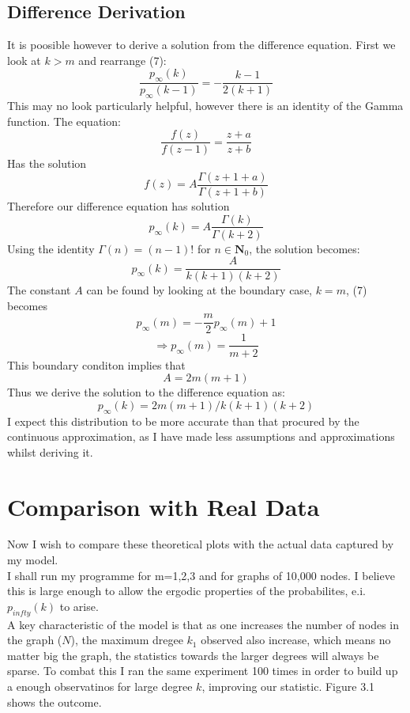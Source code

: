 \documentclass[]{article}
\begin{document}
\subsection{Difference Derivation}
It is poosible however to derive a solution from the difference equation. First we look at $k>m$ and rearrange (7):
\begin{equation}
\frac{p_{\infty}(k)}{p_{\infty}(k-1)}=-\frac{k-1}{2(k+1)}
\end{equation}
This may no look particularly helpful, however there is an identity of the Gamma function. The equation:
\begin{equation}
\frac{f(z)}{f(z-1)}=\frac{z+a}{z+b}
\end{equation}
Has the solution
\begin{equation}
f(z)=A\frac{\Gamma(z+1+a)}{\Gamma(z+1+b)}
\end{equation}
Therefore our difference equation has solution
\begin{equation}
p_{\infty}(k)=A\frac{\Gamma(k)}{\Gamma(k+2)}
\end{equation}
Using the identity $\Gamma(n)=(n-1)!$ for $n \in \mathbf{N}_0$, the solution becomes:
\begin{equation}
p_{\infty}(k)=\frac{A}{k(k+1)(k+2)}
\end{equation}
The constant $A$ can be found by looking at the boundary case, $k=m$, (7) becomes
\begin{equation}
p_{\infty}(m)=-\frac{m}{2}p_{\infty}(m)+1
\end{equation}
\begin{equation}
\Rightarrow p_{\infty}(m)=\frac{1}{m+2}
\end{equation}
This boundary conditon implies that 
\begin{equation}
A= 2m(m+1)
\end{equation}
Thus we derive the solution to the difference equation as:
\begin{equation}
p_{\infty}(k)=2m(m+1)/k(k+1)(k+2)
\end{equation}
I expect this distribution to be more accurate than that procured by the continuous approximation, as I have made less assumptions and approximations whilst deriving it.
\section{Comparison with Real Data}
Now I wish to compare these theoretical plots with the actual data captured by my model.\\
I shall run my programme for m=1,2,3 and for graphs of 10,000 nodes. I believe this is large enough to allow the ergodic properties of the probabilites, e.i. $p_{infty}(k)$ to arise.\\
 A key characteristic of the model is that as one increases the number of nodes in the graph ($N$), the maximum dregee $k_1$ observed also increase, which means no matter big the graph, the statistics towards the larger degrees will always be sparse. To combat this I ran the same experiment 100 times in order to build up a enough observatinos for large degree $k$, improving our statistic. Figure 3.1 shows the outcome. 
 
\end{document}
